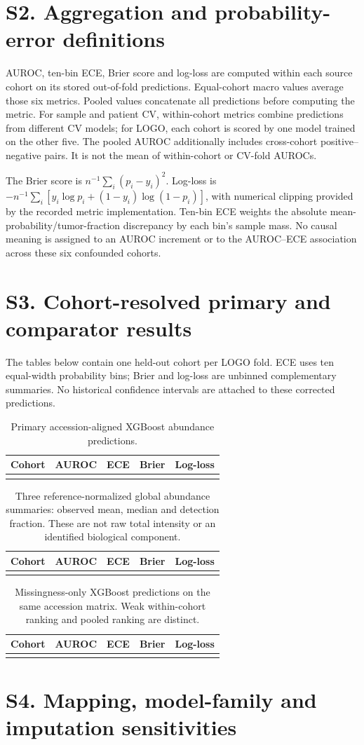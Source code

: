 \documentclass[11pt]{article}
\makeatletter
\let\tableinput\@@input
\newcommand{\metrictable}[2]{%
\begin{table}[htbp]\centering
\caption{#1}
\begin{tabular}{lrrrr}\toprule
Cohort & AUROC & ECE & Brier & Log-loss \\
\midrule\tableinput{tables/#2}\bottomrule
\end{tabular}\end{table}}
\makeatother
\begin{document}
\section*{S2. Aggregation and probability-error definitions}

AUROC, ten-bin ECE, Brier score and log-loss are computed within each
source cohort on its stored out-of-fold predictions. Equal-cohort macro
values average those six metrics. Pooled values concatenate all
predictions before computing the metric. For sample and patient CV,
within-cohort metrics combine predictions from different CV models;
for LOGO, each cohort is scored by one model trained on the other five.
The pooled AUROC additionally includes cross-cohort positive--negative
pairs. It is not the mean of within-cohort or CV-fold AUROCs.

The Brier score is $n^{-1}\sum_i(p_i-y_i)^2$. Log-loss is
$-n^{-1}\sum_i[y_i\log p_i+(1-y_i)\log(1-p_i)]$, with numerical clipping
provided by the recorded metric implementation. Ten-bin ECE weights
the absolute mean-probability/tumor-fraction discrepancy by each bin's
sample mass. No causal meaning is assigned to an AUROC increment or to
the AUROC--ECE association across these six confounded cohorts.

\clearpage
\section*{S3. Cohort-resolved primary and comparator results}

The tables below contain one held-out cohort per LOGO fold. ECE uses ten
equal-width probability bins; Brier and log-loss are unbinned complementary
summaries. No historical confidence intervals are attached to these
corrected predictions.

\metrictable{Primary accession-aligned XGBoost abundance predictions.}{primary_rows.tex}
\metrictable{Three reference-normalized global abundance summaries:
observed mean, median and detection fraction. These are not raw total
intensity or an identified biological component.}{global_rows.tex}
\metrictable{Missingness-only XGBoost predictions on the same accession
matrix. Weak within-cohort ranking and pooled ranking are distinct.}{missingness_rows.tex}

\clearpage
\section*{S4. Mapping, model-family and imputation sensitivities}
\end{document}
